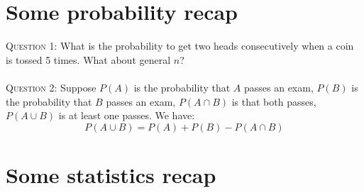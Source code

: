 \documentclass[11pt]{article}
\begin{document}



\appendix  

\section{Some probability recap} 

\textsc{Question 1:} What is the probability to get two heads consecutively when a coin is tossed 5 times. What about general $n$? \\ \\ 
\textsc{Question 2:} Suppose $P(A)$ is the probability that $A$ passes an exam, $P(B)$ is the probability that $B$ passes an exam, $P(A \cap B)$ is that both passes, $P(A \cup B)$ is at least one passes. We have: 
\[ P(A \cup B) = P(A) + P(B) - P(A \cap B) \] 




\section{Some statistics recap}
\end{document}
